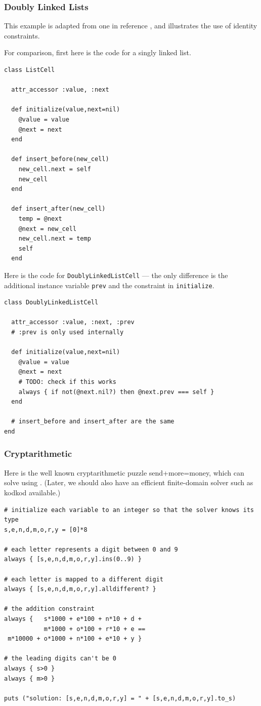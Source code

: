 \subsubsection{Doubly Linked Lists}


This example is adapted from one in reference \cite{lopez-ecoop-1994},
and illustrates the use of identity constraints.

For comparison, first here is the code for a singly linked list.

\begin{lstlisting}
class ListCell

  attr_accessor :value, :next

  def initialize(value,next=nil)
    @value = value
    @next = next
  end

  def insert_before(new_cell)
    new_cell.next = self
    new_cell
  end

  def insert_after(new_cell)
    temp = @next
    @next = new_cell
    new_cell.next = temp
    self
  end
\end{lstlisting}

Here is the code for \lstinline{DoublyLinkedListCell} --- the only
difference is the additional instance variable \lstinline{prev} and
the constraint in \lstinline{initialize}.

\begin{lstlisting}
class DoublyLinkedListCell

  attr_accessor :value, :next, :prev 
  # :prev is only used internally

  def initialize(value,next=nil)
    @value = value
    @next = next
    # TODO: check if this works
    always { if not(@next.nil?) then @next.prev === self }
  end

  # insert_before and insert_after are the same 
end
\end{lstlisting}

\subsubsection{Cryptarithmetic}

Here is the well known cryptarithmetic puzzle send+more=money, which \toolname can solve
using \zthree.  (Later, we should also have an efficient finite-domain
solver such as kodkod available.)
\begin{lstlisting}
# initialize each variable to an integer so that the solver knows its type
s,e,n,d,m,o,r,y = [0]*8

# each letter represents a digit between 0 and 9
always { [s,e,n,d,m,o,r,y].ins(0..9) } 

# each letter is mapped to a different digit
always { [s,e,n,d,m,o,r,y].alldifferent? }

# the addition constraint
always {   s*1000 + e*100 + n*10 + d +
           m*1000 + o*100 + r*10 + e ==
 m*10000 + o*1000 + n*100 + e*10 + y }

# the leading digits can't be 0
always { s>0 }
always { m>0 }

puts ("solution: [s,e,n,d,m,o,r,y] = " + [s,e,n,d,m,o,r,y].to_s)
\end{lstlisting}

